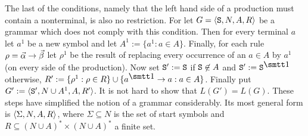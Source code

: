 The last of the conditions, namely that the left hand side of a
production must contain a nonterminal, is also no restriction.
For let $G = \langle \mbox{\tt S}, N, A, R\rangle$ be a grammar which does
not comply with this condition. Then for every terminal $a$
let $a^1$ be a new symbol and let $A^1 := \{a^1 : a \in A\}$.
Finally, for each rule $\rho = \vec{\alpha} \rightarrow \vec{\beta}$
let $\rho^1$ be the result of replacing every occurrence of
an $a \in A$ by $a^1$ (on every side of the production).
Now set $\mbox{\tt S}':= \mbox{\tt S}$ if $\mbox{\tt S} \not\in A$
and $\mbox{\tt S}' := \mbox{\tt S}^{\seins}$ otherwise, 
$R' := \{\rho^1 : \rho \in R\} \cup \{a^{\seins} \pf a : a \in A\}$.
Finally put $G' := \langle \mbox{\tt S}', N \cup A^1, A, R'\rangle$.
It is not hard to show that $L(G') = L(G)$. These steps have 
simplified the notion of a grammar considerably. Its most general 
form is $\langle \Sigma, N, A, R\rangle$, where $\Sigma \subseteq 
N$ is the set of start symbols and $R \subseteq (N \cup A)^{\ast} 
\times (N \cup A)^{\ast}$ a finite set.

